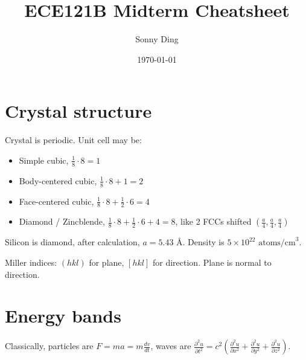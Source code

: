 \documentclass[a4paper,10pt]{article}
\title{\setstretch{0.8}ECE121B Midterm Cheatsheet}
\author{\setstretch{0.8}Sonny Ding}
\date{\setstretch{0.8}\today}
\begin{document}
\maketitle

\raggedcolumns
\begin{multicols}{3}


\setlength{\abovedisplayskip}{0pt}
\setlength{\belowdisplayskip}{0pt}

\section*{Crystal structure}

Crystal is periodic. Unit cell may be:

\begin{itemize}[noitemsep, topsep=0pt, left=0pt]
    \item Simple cubic, $\frac{1}{8}\cdot 8 = 1$
    \item Body-centered cubic, $\frac{1}{8}\cdot 8 + 1 = 2$
    \item Face-centered cubic, $\frac{1}{8}\cdot 8 + \frac{1}{2}\cdot 6 = 4$
    \item Diamond / Zincblende, $\frac{1}{8}\cdot 8 + \frac{1}{2}\cdot 6 + 4 = 8$, like 2 FCCs shifted $(\frac{a}{4}, \frac{a}{4}, \frac{a}{4})$
\end{itemize}

Silicon is diamond, after calculation, $a = 5.43 \text{ \AA}$. Density is $5\times 10^{22} \text{ atoms/cm}^3$.

Miller indices: $(hkl)$ for plane, $[hkl]$ for direction. Plane is normal to direction.

\section*{Energy bands}

Classically, particles are $F=ma = m \frac{dv}{dt}$, waves are $\frac{\partial^2 u}{\partial t^2} = c^2 \left( \frac{\partial^2 u}{\partial x^2} + \frac{\partial^2 u}{\partial y^2} + \frac{\partial^2 u}{\partial z^2} \right)$.


\end{multicols}
\end{document}

